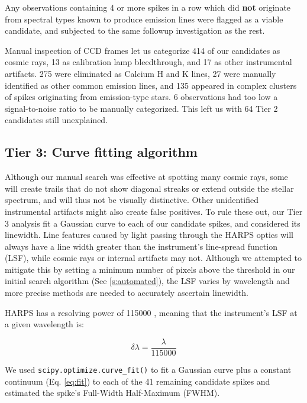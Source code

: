 \documentclass[twocolumn]{aastex701}
\begin{document}
Any observations containing 4 or more spikes in a row which did \textbf{not} originate from spectral types known to produce emission lines were flagged as a viable candidate, and subjected to the same followup investigation as the rest. 

Manual inspection of CCD frames let us categorize 414 of our candidates as cosmic rays, 13 as calibration lamp bleedthrough, and 17 as other instrumental artifacts.  275 were eliminated as Calcium H and K lines, 27 were manually identified as other common emission lines, and 135 appeared in complex clusters of spikes originating from emission-type stars.  6 observations had too low a signal-to-noise ratio to be manually categorized.  This left us with 64 Tier 2 candidates still unexplained.

\subsection{Tier 3: Curve fitting algorithm}
\label{s:curvefit}

Although our manual search was effective at spotting many cosmic rays, some will create trails that do not show diagonal streaks or extend outside the stellar spectrum, and will thus not be visually distinctive.  Other unidentified instrumental artifacts might also create false positives.  To rule these out, our Tier 3 analysis fit a Gaussian curve to each of our candidate spikes, and considered its linewidth.  Line features caused by light passing through the HARPS optics will always have a line width greater than the instrument's line-spread function (LSF), while cosmic rays or internal artifacts may not. Although we attempted to mitigate this by setting a minimum number of pixels above the threshold in our initial search algorithm (See \ref{s:automated}), the LSF varies by wavelength and more precise methods are needed to accurately ascertain linewidth.

HARPS has a resolving power of 115000 \citep{HARPS_specs}, meaning that the instrument's LSF at a given wavelength is: 

\begin{equation}
    \delta\lambda = \frac{\lambda}{115000}
    \label{eq:LSF}
\end{equation}

We used \texttt{scipy.optimize.curve\_fit()} \citep{2020SciPy-NMeth} to fit a Gaussian curve plus a constant continuum (Eq. \ref{eq:fit}) to each of the 41 remaining candidate spikes and estimated the spike's Full-Width Half-Maximum (FWHM). 
\end{document}
